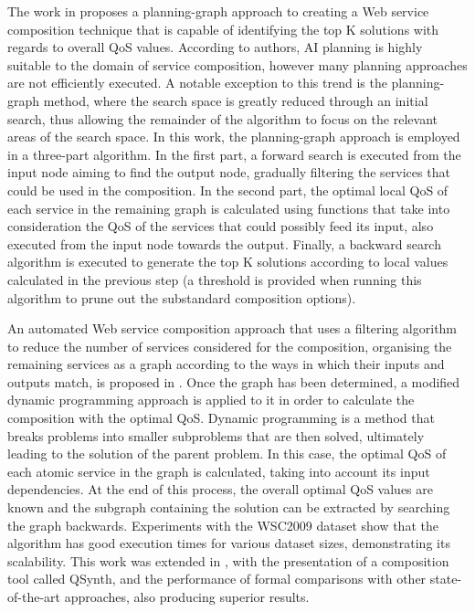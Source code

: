 The work in \cite{deng2013efficient} proposes a planning-graph approach to creating a Web service composition technique that is capable of identifying the top K solutions with regards to overall QoS values. According to authors, AI planning is highly suitable to the domain of service composition, however many planning approaches are not efficiently executed. A notable exception to this trend is the planning-graph method, where the search space is greatly reduced through an initial search, thus allowing the remainder of the algorithm to focus on the relevant areas of the search space. In this work, the planning-graph approach is employed in a three-part algorithm. In the first part, a forward search is executed from the input node aiming to find the output node, gradually filtering the services that could be used in the composition. In the second part, the optimal local QoS of each service in the remaining graph is calculated using functions that take into consideration the QoS of the services that could possibly feed its input, also executed from the input node towards the output. Finally, a backward search algorithm is executed to generate the top K solutions according to local values calculated in the previous step (a threshold is provided when running this algorithm to prune out the substandard composition options).

An automated Web service composition approach that uses a filtering algorithm to reduce the number of services considered for the composition, organising the remaining services as a graph according to the ways in which their inputs and outputs match, is proposed in \cite{huang2009effective}. Once the graph has been determined, a modified dynamic programming approach is applied to it in order to calculate the composition with the optimal QoS. Dynamic programming is a method that breaks problems into smaller subproblems that are then solved, ultimately leading to the solution of the parent problem. In this case, the optimal QoS of each atomic service in the graph is calculated, taking into account its input dependencies. At the end of this process, the overall optimal QoS values are known and the subgraph containing the solution can be extracted by searching the graph backwards. Experiments with the WSC2009 dataset show that the algorithm has good execution times for various dataset sizes, demonstrating its scalability. This work was extended in \cite{jiang2010qsynth}, with the presentation of a composition tool called QSynth, and the performance of formal comparisons with other state-of-the-art approaches, also producing superior results.

